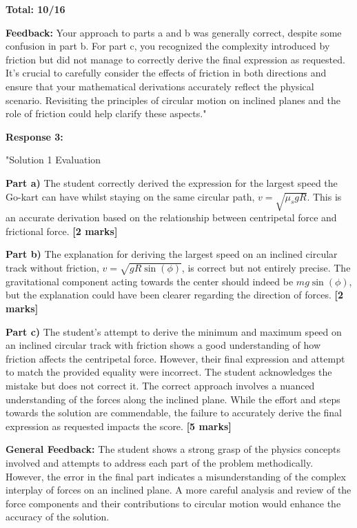 \documentclass[a4paper,11pt]{article}
\begin{document}
\textbf{Total: 10/16}

\textbf{Feedback:} Your approach to parts a and b was generally correct, despite some confusion in part b. For part c, you recognized the complexity introduced by friction but did not manage to correctly derive the final expression as requested. It's crucial to carefully consider the effects of friction in both directions and ensure that your mathematical derivations accurately reflect the physical scenario. Revisiting the principles of circular motion on inclined planes and the role of friction could help clarify these aspects."

\textbf{Response 3:}

"Solution 1 Evaluation

\textbf{Part a)} The student correctly derived the expression for the largest speed the Go-kart can have whilst staying on the same circular path, \(v = \sqrt{\mu_s g R}\). This is an accurate derivation based on the relationship between centripetal force and frictional force. \textbf{[2 marks]}

\textbf{Part b)} The explanation for deriving the largest speed on an inclined circular track without friction, \(v = \sqrt{gR\sin(\phi)}\), is correct but not entirely precise. The gravitational component acting towards the center should indeed be \(mg\sin(\phi)\), but the explanation could have been clearer regarding the direction of forces. \textbf{[2 marks]}

\textbf{Part c)} The student's attempt to derive the minimum and maximum speed on an inclined circular track with friction shows a good understanding of how friction affects the centripetal force. However, their final expression and attempt to match the provided equality were incorrect. The student acknowledges the mistake but does not correct it. The correct approach involves a nuanced understanding of the forces along the inclined plane. While the effort and steps towards the solution are commendable, the failure to accurately derive the final expression as requested impacts the score. \textbf{[5 marks]}

\textbf{General Feedback:} The student shows a strong grasp of the physics concepts involved and attempts to address each part of the problem methodically. However, the error in the final part indicates a misunderstanding of the complex interplay of forces on an inclined plane. A more careful analysis and review of the force components and their contributions to circular motion would enhance the accuracy of the solution.
\end{document}
